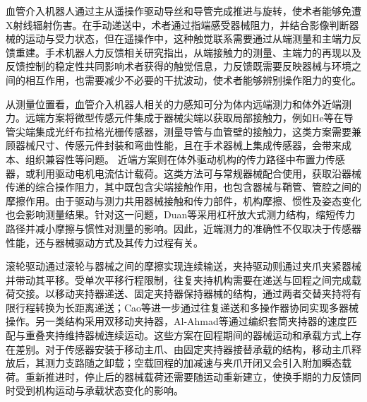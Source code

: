 \documentclass{JQRnew}
\begin{document}
\maketitle

血管介入机器人通过主从遥操作驱动导丝和导管完成推进与旋转，使术者能够免遭X射线辐射伤害。在手动递送中，术者通过指端感受器械阻力，并结合影像判断器械的运动与受力状态，但在遥操作中，这种触觉联系需要通过从端测量和主端力反馈重建。手术机器人力反馈相关研究指出，从端接触力的测量、主端力的再现以及反馈控制的稳定性共同影响术者获得的触觉信息，力反馈既需要反映器械与环境之间的相互作用，也需要减少不必要的干扰波动，使术者能够辨别操作阻力的变化。

从测量位置看，血管介入机器人相关的力感知可分为体内远端测力和体外近端测力。远端方案将微型传感元件集成于器械尖端以获取局部接触力，例如He等在导管尖端集成光纤布拉格光栅传感器，测量导管与血管壁的接触力，这类方案需要兼顾器械尺寸、传感元件封装和弯曲性能，且在手术器械上集成传感器，会带来成本、组织兼容性等问题。
\JQRpubidadjcol
近端方案则在体外驱动机构的传力路径中布置力传感器，或利用驱动电机电流估计载荷。这类方法可与常规器械配合使用，获取沿器械传递的综合操作阻力，其中既包含尖端接触作用，也包含器械与鞘管、管腔之间的摩擦作用。由于驱动与测力共用器械接触和传力部件，机构摩擦、惯性及姿态变化也会影响测量结果。针对这一问题，Duan等采用杠杆放大式测力结构，缩短传力路径并减小摩擦与惯性对测量的影响。因此，近端测力的准确性不仅取决于传感器性能，还与器械驱动方式及其传力过程有关。

滚轮驱动通过滚轮与器械之间的摩擦实现连续输送，夹持驱动则通过夹爪夹紧器械并带动其平移。受单次平移行程限制，往复夹持机构需要在递送与回程之间完成载荷交接。以移动夹持器递送、固定夹持器保持器械的结构，通过两者交替夹持将有限行程转换为长距离递送；Cao等进一步通过往复递送和多操作器协同实现多器械操作。另一类结构采用双移动夹持器，Al-Ahmad等通过编织套筒夹持器的速度匹配与重叠夹持维持器械连续运动。这些方案在回程期间的器械运动和承载方式上存在差别。对于传感器安装于移动主爪、由固定夹持器接替承载的结构，移动主爪释放后，其测力支路随之卸载；空载回程的加减速与夹爪开闭又会引入附加瞬态载荷。重新推进时，停止后的器械载荷还需要随运动重新建立，使换手期的力反馈同时受到机构运动与承载状态变化的影响。
\end{document}
